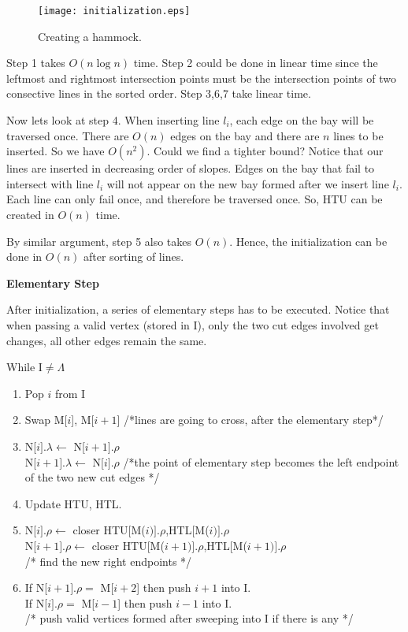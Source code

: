 \documentclass[12pt]{article}
\begin{document}
\begin{figure}
\center
\texttt{[image: initialization.eps]}
\caption{Creating a hammock.}
\label{figure.init}
\end{figure}

Step 1 takes $O(n\log n)$ time. Step 2 could be done in linear time
since the leftmost and rightmost intersection points must be the 
intersection points of two consective lines in the sorted order. Step
3,6,7 take linear time. 

Now lets look at step 4. When inserting line $l_{i}$, each edge on the
bay will be traversed once. There are $O(n)$ edges on the bay and
there are $ n $ lines to be inserted. So we have $O(n^2)$. Could we
find a tighter bound? Notice that our lines are inserted in decreasing
order of slopes. Edges on the bay that fail to intersect with line
$l_{i}$ will not appear on the new bay formed after we insert line
$l_{i}$. Each line can only fail once, and therefore be traversed once.
So, HTU can be created in $O(n)$ time.

By similar argument, step 5 also takes $O(n)$. Hence, the initialization
can be done in $O(n)$ after sorting of lines.

\vspace{.2 cm}

{\bf Elementary Step}

\vspace{.2 cm}

After initialization, a series of elementary steps has to be executed.
Notice that when passing a valid vertex (stored in I), only the two
cut edges involved get changes, all other edges remain the same.

\vspace{.2 cm}

While I$\neq \Lambda$
\begin{enumerate}
\item Pop $i$ from I
\item Swap M[$i$], M[$i+1$] /*lines are going to cross, after the elementary step*/
\item N[$i].\lambda \leftarrow$ N[$i+1].\rho $ \\
      N[$i+1].\lambda \leftarrow$ N[$i].\rho $ /*the point of elementary step
becomes the left endpoint of the two new cut edges */ 
\item Update HTU, HTL.
\item N[$i].\rho \leftarrow $ closer {HTU[M($i)].\rho$,HTL[M($i)].\rho$} \\
      N[$i+1].\rho \leftarrow$ closer {HTU[M($i+1)].\rho$,HTL[M($i+1)].\rho$} \\
      /* find the new right endpoints */
\item If N[$i+1].\rho =$ M[$i+2$] then push $i+1$ into I. \\
      If N[$i].\rho =$ M[$i-1$] then push $i-1$ into I. \\
      /* push valid vertices formed after sweeping into I if there is any */
\end{enumerate}
\end{document}

